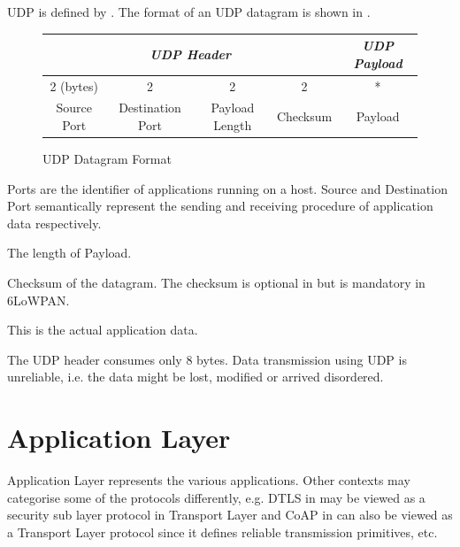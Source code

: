 UDP is defined by \cite{rfc768}. The format of an UDP datagram is shown in .

\begin{figure}[h!]
	\center
	\begin{tabular}{ccccc}
		\multicolumn{4}{c}{\textit{UDP Header}}                                                                                                                & \textit{UDP Payload}         \\ \hline
		\multicolumn{1}{|c|}{2 (bytes)} & \multicolumn{1}{c|}{2}                & \multicolumn{1}{c|}{2}              & \multicolumn{1}{c|}{2}        & \multicolumn{1}{c|}{*}       \\ \hline
		\multicolumn{1}{|c|}{Source Port}        & \multicolumn{1}{c|}{Destination Port} & \multicolumn{1}{c|}{Payload Length} & \multicolumn{1}{c|}{Checksum} & \multicolumn{1}{c|}{Payload} \\ \hline
	\end{tabular}
	\caption{UDP Datagram Format}
	\label{Fig: UDP Datagram Format}
\end{figure}

\begin{description}[style=nextline]
	\item[\textbf{Source and Destination Port}]
	Ports are the identifier of applications running on a host. Source and Destination Port semantically represent the sending and receiving procedure of application data respectively.
	\item[\textbf{Payload Length}]
	The length of Payload.
	\item[\textbf{Checksum}]
	Checksum of the datagram. The checksum is optional in \cite{rfc768} but is mandatory in 6LoWPAN.
	\item[\textbf{Payload}]
	This is the actual application data.
\end{description}

The UDP header consumes only 8 bytes. Data transmission using UDP is unreliable, i.e. the data might be lost, modified or arrived disordered. 

\section{Application Layer}
Application Layer represents the various applications. Other contexts may categorise some of the protocols differently, e.g. DTLS in  may be viewed as a security sub layer protocol in Transport Layer and CoAP in  can also be viewed as a Transport  Layer protocol since it defines reliable transmission primitives, etc.

